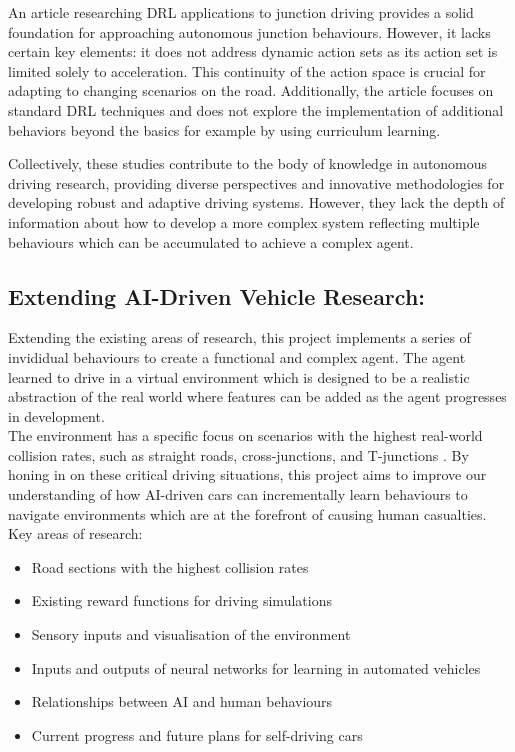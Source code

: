 \documentclass{article}
\begin{document}
An article researching DRL applications to junction driving \cite{junction_driving} provides a solid foundation for approaching autonomous junction behaviours. However, it lacks certain key elements: it does not address dynamic action sets as its action set is limited solely to acceleration. This continuity of the action space is crucial for adapting to changing scenarios on the road. Additionally, the article focuses on standard DRL techniques and does not explore the implementation of additional behaviors beyond the basics for example by using curriculum learning. 

Collectively, these studies contribute to the body of knowledge in autonomous driving research, providing diverse perspectives and innovative methodologies for developing robust and adaptive driving systems. However, they lack the depth of information about how to develop a more complex system reflecting multiple behaviours which can be accumulated to achieve a complex agent. \\

\subsection{Extending AI-Driven Vehicle Research:}
Extending the existing areas of research, this project implements a series of invididual behaviours to create a functional and complex agent. The agent learned to drive in a virtual environment which is designed to be a realistic abstraction of the real world where features can be added as the agent progresses in development. \\ 

The environment has a specific focus on scenarios with the highest real-world collision rates, such as straight roads, cross-junctions, and T-junctions \cite{accident-types-and-causes}. By honing in on these critical driving situations, this project aims to improve our understanding of how AI-driven cars can incrementally learn behaviours to navigate environments which are at the forefront of causing human casualties. \\

Key areas of research:
\begin{itemize}
    \item Road sections with the highest collision rates \cite{accident-types-and-causes}
    \item Existing reward functions for driving simulations \cite{Predictive-reward-function-for-ai-driving} \cite{Racing-reward-functions} \cite{Deep-RL-for-racing-driving} 
    \item Sensory inputs and visualisation of the environment \cite{General-overview-of-ai-driving}
    \item Inputs and outputs of neural networks for learning in automated vehicles \cite{Collision-avoidance-in-lane-free-traffic-neural-system} \cite{Deep-RL-for-AI-driving-general-overview}
    \item Relationships between AI and human behaviours \cite{Collision-frequency-ai-and-humans} 
    \item Current progress and future plans for self-driving cars \cite{Deep-learning-for-AI-driving}
\end{itemize}
\end{document}
